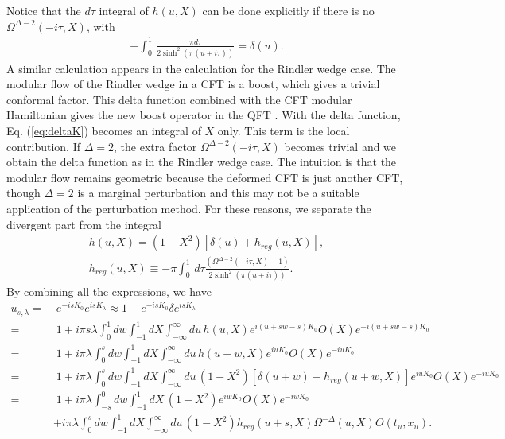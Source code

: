 \documentclass[a4paper,11pt]{article}
\theoremstyle{definition}
\begin{document}
Notice that the $d\tau$ integral of $h(u,X)$ can be done explicitly if there is no $\Omega^{\Delta-2}(-i\tau,X)$, with
\begin{align}
    -\int_0^1\, \frac{ \pi d\tau }{2\sinh^2(\pi (u+i\tau))} = \delta(u).
\end{align}
A similar calculation appears in the calculation for the Rindler wedge case. The modular flow of the Rindler wedge in a CFT is a boost, which gives a trivial conformal factor. This delta function combined with the CFT modular Hamiltonian gives the new boost operator in the QFT \cite{}. With the delta function, Eq. (\ref{eq:deltaK}) becomes an integral of $X$ only. This term is the local contribution.  If $\Delta = 2$, the extra factor $\Omega^{\Delta-2}(-i\tau,X)$ becomes trivial and we obtain the delta function as in the Rindler wedge case. The intuition is that the modular flow remains geometric because the deformed CFT is just another CFT, though $\Delta = 2$ is a marginal perturbation and this may not be a suitable application of the perturbation method. For these reasons, we separate the divergent part from the integral
\begin{gather}
    h(u,X) =  (1-X^2)\left[\delta(u) + h_{reg}(u,X)\right], \\
    h_{reg}(u,X) \equiv -\pi\int_0^1\, d\tau \frac{ (\Omega^{\Delta-2}(-i\tau,X) -1)}{2\sinh^2(\pi (u+i\tau))} .
\end{gather}
By combining all the expressions, we have
\begin{align}
    u_{s,\lambda} =&\; e^{-isK_0}e^{isK_\lambda} \approx 1 + e^{-isK_0}\delta e^{isK_\lambda}\\
    =&\; 1 + i\pi s\lambda\int_0^1 dw  \int_{-1}^1 dX \int_{-\infty}^{\infty} du \, h(u,X) e^{i(u+sw-s)K_0} O(X) e^{-i(u+sw-s)K_0} \\
    =&\; 1 + i\pi \lambda\int_0^s dw  \int_{-1}^1 dX \int_{-\infty}^{\infty} du \, h(u+w,X) e^{iuK_0} O(X) e^{-iuK_0} \\
    =&\; 1 + i\pi \lambda\int_0^s dw  \int_{-1}^1 dX \int_{-\infty}^{\infty} du \, (1-X^2)\left[\delta(u+w) + h_{reg}(u+w,X)\right] e^{iuK_0} O(X) e^{-iuK_0}\\
    =&\; 1 + i\pi \lambda\int_{-s}^0 dw  \int_{-1}^1 dX \, (1-X^2)e^{iwK_0} O(X) e^{-iwK_0} \nonumber\\
    &+ {i\pi \lambda}\int_0^s dw  \int_{-1}^1 dX \int_{-\infty}^{\infty} du \, (1-X^2)h_{reg}(u+s,X) \Omega^{-\Delta}(u,X)O(t_u,x_u).
\end{align}
\end{document}
